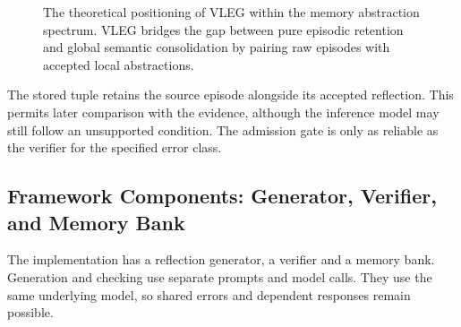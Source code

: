 \documentclass[onecolumn]{IEEEtran}
\numberwithin{equation}{section}
\theoremstyle{definition}
\theoremstyle{remark}
\begin{document}
\begin{figure}[htbp]
\centering
{}
\caption{The theoretical positioning of VLEG within the memory abstraction spectrum. VLEG bridges the gap between pure episodic retention and global semantic consolidation by pairing raw episodes with accepted local abstractions.}
\label{fig:vleg_spectrum}
\end{figure}

The stored tuple retains the source episode alongside its accepted reflection. This permits later comparison with the evidence, although the inference model may still follow an unsupported condition. The admission gate is only as reliable as the verifier for the specified error class.

\subsection{Framework Components: Generator, Verifier, and Memory Bank}

The implementation has a reflection generator, a verifier and a memory bank. Generation and checking use separate prompts and model calls. They use the same underlying model, so shared errors and dependent responses remain possible.
\end{document}
